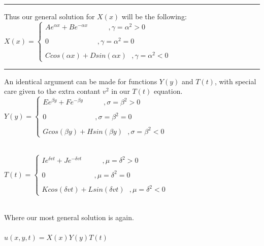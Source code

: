 \documentclass[fleqn]{article}
\begin{document}
\begin{enumerate}
\begin{enumerate}
      \textcolor{hwColor}{ 
        \rule{16cm}{1pt} 
      }

      \textcolor{hwColor}{ 
        Thus our general solution for $X(x)$ will be the following: \\
        $
          X(x)=\begin{cases}
            Ae^{\alpha x}+Be^{-\alpha x} ~~~~~~~~~~~~~, \gamma=\alpha^2 > 0 \\
            \\
            0 ~~~~~~~~~~~~~~~~~~~~~~~~~~~~~~~, \gamma=\alpha^2=0 \\
            \\
            Ccos(\alpha x)+Dsin(\alpha x) ~~~, \gamma=\alpha^2 < 0
          \end{cases}
        $
      }

      \textcolor{hwColor}{ 
        \rule{16cm}{1pt} 
      }

      \textcolor{hwColor}{ 
        An identical argument can be made for functions $Y(y)$ and $T(t)$, with special care given to the extra
        contant $v^2$ in our $T(t)$ equation. \\
        $
        Y(y)=\begin{cases}
          Ee^{\beta y}+Fe^{-\beta y} ~~~~~~~~~~~~~, \sigma=\beta^2 > 0 \\
          \\
          0 ~~~~~~~~~~~~~~~~~~~~~~~~~~~~~~~, \sigma=\beta^2=0 \\
          \\
          Gcos(\beta y)+Hsin(\beta y) ~~~, \sigma=\beta^2 < 0
        \end{cases}
        $ \\
        \\
      }

      
      \textcolor{hwColor}{ 
        $
        T(t)=\begin{cases}
          Ie^{\delta v t}+Je^{-\delta v t} ~~~~~~~~~~~~~, \mu=\delta^2 > 0 \\
          \\
          0 ~~~~~~~~~~~~~~~~~~~~~~~~~~~~~~~, \mu=\delta^2=0 \\
          \\
          Kcos(\delta v t)+Lsin(\delta v t) ~~~, \mu=\delta^2 < 0
        \end{cases}
        $ \\
        \\
      }

      \textcolor{hwColor}{ 
        Where our most general solution is again. \\
        \\
        $u(x,y,t)=X(x)Y(y)T(t)$
      }



\end{enumerate}
\end{enumerate}
\end{document}

